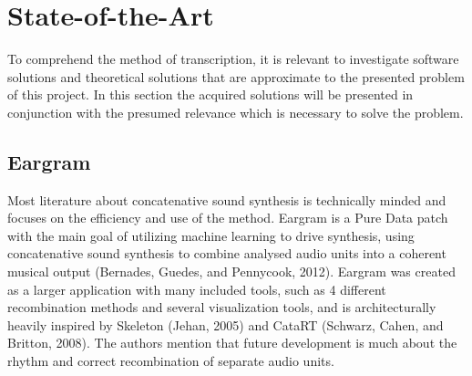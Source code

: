 \section{ State-of-the-Art }
To comprehend the method of transcription, it is relevant to investigate software solutions and theoretical solutions that are approximate to the presented problem of this project. In this section the acquired solutions will be presented in conjunction with the presumed relevance which is necessary to solve the problem.
\subsection{ Eargram }
Most literature about concatenative sound synthesis is technically minded and focuses on the efficiency and use of the method. 
Eargram is a Pure Data patch with the main goal of utilizing machine learning to drive synthesis, using concatenative sound synthesis to combine analysed audio units into a coherent musical output (Bernades, Guedes, and Pennycook, 2012). Eargram was created as a larger application with many included tools, such as 4 different recombination methods and several visualization tools, and is architecturally heavily inspired by Skeleton (Jehan, 2005) and CataRT (Schwarz, Cahen, and Britton, 2008).
The authors mention that future development is much about the rhythm and correct recombination of separate audio units.

